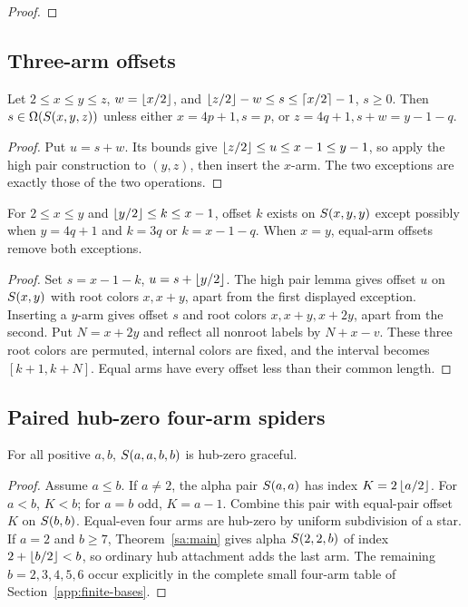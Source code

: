 \begin{proof}
\end{proof}

\subsection{Three-arm offsets}\label{app:triple-offsets}
\begin{lemma}\label{po:triple-low}
Let $2\le x\le y\le z$, $w=\left\lfloor x/2\right\rfloor$, and
$\left\lfloor z/2\right\rfloor-w\le s\le\left\lceil x/2\right\rceil-1$, $s\ge0$. Then $s\in\Omega(S\!\left(x,y,z\right))$ unless either $x=4p+1,s=p$, or $z=4q+1,s+w=y-1-q$.
\end{lemma}
\begin{proof}
Put $u=s+w$. Its bounds give $\left\lfloor z/2\right\rfloor\le u\le x-1\le y-1$, so apply the high pair construction to $(y,z)$, then insert the $x$-arm. The two exceptions are exactly those of the two operations.
\end{proof}
\begin{lemma}\label{po:repeated-triple}
For $2\le x\le y$ and $\left\lfloor y/2\right\rfloor\le k\le x-1$, offset $k$ exists on $S\!\left(x,y,y\right)$ except possibly when $y=4q+1$ and $k=3q$ or $k=x-1-q$. When $x=y$, equal-arm offsets remove both exceptions.
\end{lemma}
\begin{proof}
Set $s=x-1-k$, $u=s+\left\lfloor y/2\right\rfloor$. The high pair lemma gives offset $u$ on $S\!\left(x,y\right)$ with root colors $x,x+y$, apart from the first displayed exception. Inserting a $y$-arm gives offset $s$ and root colors $x,x+y,x+2y$, apart from the second. Put $N=x+2y$ and reflect all nonroot labels by $N+x-v$. These three root colors are permuted, internal colors are fixed, and the interval becomes $[k+1,k+N]$. Equal arms have every offset less than their common length.
\end{proof}

\subsection{Paired hub-zero four-arm spiders}\label{po:paired-four}
\begin{lemma}
For all positive $a,b$, $S\!\left(a,a,b,b\right)$ is hub-zero graceful.
\end{lemma}
\begin{proof}
Assume $a\le b$. If $a\ne2$, the alpha pair $S\!\left(a,a\right)$ has index $K=2\left\lfloor a/2\right\rfloor$. For $a<b$, $K<b$; for $a=b$ odd, $K=a-1$. Combine this pair with equal-pair offset $K$ on $S\!\left(b,b\right)$. Equal-even four arms are hub-zero by uniform subdivision of a star. If $a=2$ and $b\ge7$, Theorem~\ref{sa:main} gives alpha $S\!\left(2,2,b\right)$ of index $2+\left\lfloor b/2\right\rfloor<b$, so ordinary hub attachment adds the last arm. The remaining $b=2,3,4,5,6$ occur explicitly in the complete small four-arm table of Section~\ref{app:finite-bases}.
\end{proof}
